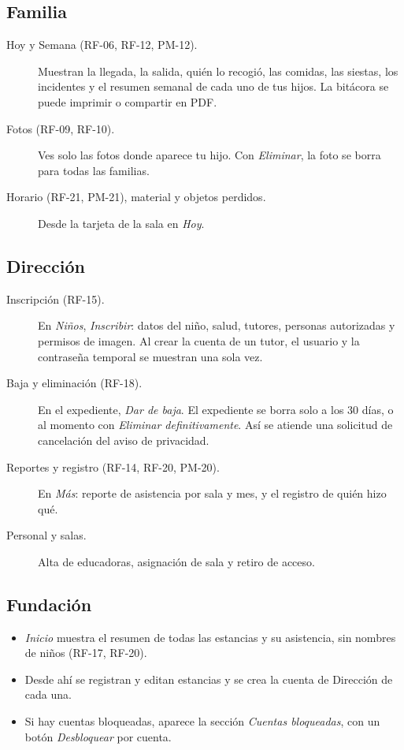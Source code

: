 \subsection{Familia}
\begin{description}
	\item[Hoy y Semana (RF-06, RF-12, PM-12).] Muestran la llegada, la salida, quién lo recogió, las comidas, las siestas, los incidentes y el resumen semanal de cada uno de tus hijos. La bitácora se puede imprimir o compartir en PDF.
	\item[Fotos (RF-09, RF-10).] Ves solo las fotos donde aparece tu hijo. Con \emph{Eliminar}, la foto se borra para todas las familias.
	\item[Horario (RF-21, PM-21), material y objetos perdidos.] Desde la tarjeta de la sala en \emph{Hoy}.
\end{description}

\subsection{Dirección}
\begin{description}
	\item[Inscripción (RF-15).] En \emph{Niños}, \emph{Inscribir}: datos del niño, salud, tutores, personas autorizadas y permisos de imagen. Al crear la cuenta de un tutor, el usuario y la contraseña temporal se muestran una sola vez.
	\item[Baja y eliminación (RF-18).] En el expediente, \emph{Dar de baja}. El expediente se borra solo a los 30 días, o al momento con \emph{Eliminar definitivamente}. Así se atiende una solicitud de cancelación del aviso de privacidad.
	\item[Reportes y registro (RF-14, RF-20, PM-20).] En \emph{Más}: reporte de asistencia por sala y mes, y el registro de quién hizo qué.
	\item[Personal y salas.] Alta de educadoras, asignación de sala y retiro de acceso.
\end{description}

\subsection{Fundación}
\begin{itemize}
	\item \emph{Inicio} muestra el resumen de todas las estancias y su asistencia, sin nombres de niños (RF-17, RF-20).
	\item Desde ahí se registran y editan estancias y se crea la cuenta de Dirección de cada una.
	\item Si hay cuentas bloqueadas, aparece la sección \emph{Cuentas bloqueadas}, con un botón \emph{Desbloquear} por cuenta.
\end{itemize}

